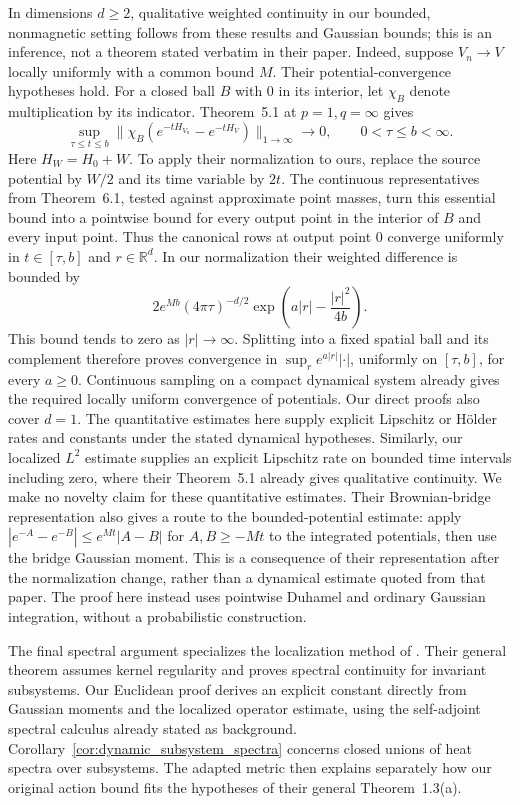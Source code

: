 In dimensions $d\geq2$, qualitative weighted continuity in our bounded,
nonmagnetic setting follows from these results and Gaussian bounds;
this is an inference, not a theorem stated verbatim in their paper.
Indeed, suppose $V_n\to V$ locally uniformly with a common bound $M$.
Their potential-convergence hypotheses hold. For a closed ball $B$
with $0$ in its interior, let $\chi_B$ denote multiplication by its
indicator. Theorem~5.1 at $p=1,q=\infty$ gives
\[
\sup_{\tau\leq t\leq b}
\|\chi_B(e^{-tH_{V_n}}-e^{-tH_V})\|_{1\to\infty}\longrightarrow0,
\qquad 0<\tau\leq b<\infty.
\]
Here $H_W=H_0+W$. To apply their normalization to ours, replace the
source potential by $W/2$ and its time variable by $2t$.
The continuous representatives from Theorem~6.1, tested against
approximate point masses, turn this essential bound into a pointwise
bound for every output point in the interior of $B$ and every input
point. Thus the canonical rows at output point $0$ converge uniformly
in $t\in[\tau,b]$ and $r\in\mathbb R^d$. In our normalization their
weighted difference is bounded by
\[
2e^{Mb}(4\pi\tau)^{-d/2}
 \exp\!\left(a|r|-\frac{|r|^2}{4b}\right).
\]
This bound tends to zero as $|r|\to\infty$. Splitting into a fixed
spatial ball and its complement therefore proves convergence in
$\sup_r e^{a|r|}|\cdot|$, uniformly on $[\tau,b]$, for every $a\geq0$.
Continuous sampling on a compact dynamical system already gives the
required locally uniform convergence of potentials. Our direct proofs
also cover $d=1$. The quantitative estimates here supply explicit
Lipschitz or H\"older rates and constants under the stated dynamical
hypotheses. Similarly, our localized $L^2$ estimate supplies an explicit
Lipschitz rate on bounded time intervals including zero, where their
Theorem~5.1 already gives qualitative continuity. We make no novelty
claim for these quantitative estimates. Their Brownian-bridge representation
\parencite[Theorem~6.1, equation~(6.9)]{BroderixHundertmarkLeschke2000}
also gives a route to the bounded-potential estimate: apply
$|e^{-A}-e^{-B}|\leq e^{Mt}|A-B|$ for $A,B\geq-Mt$
to the integrated potentials, then use the bridge Gaussian moment.
This is a consequence of their representation after the normalization
change, rather than a dynamical estimate quoted from that paper.
The proof here instead uses pointwise Duhamel and ordinary Gaussian
integration, without a probabilistic construction.

The final spectral argument specializes the localization method of
\textcite[Lemmas~4.2--4.3 and Theorem~4.6]{BeckusTakase2025Spectral}.
Their general theorem assumes kernel regularity and proves spectral
continuity for invariant subsystems. Our Euclidean proof derives an
explicit constant directly from Gaussian moments and the localized
operator estimate, using the self-adjoint spectral calculus already
stated as background. Corollary~\ref{cor:dynamic_subsystem_spectra}
concerns closed unions of heat spectra over subsystems. The adapted
metric then explains separately how our original action bound fits
the hypotheses of their general Theorem~1.3(a).

